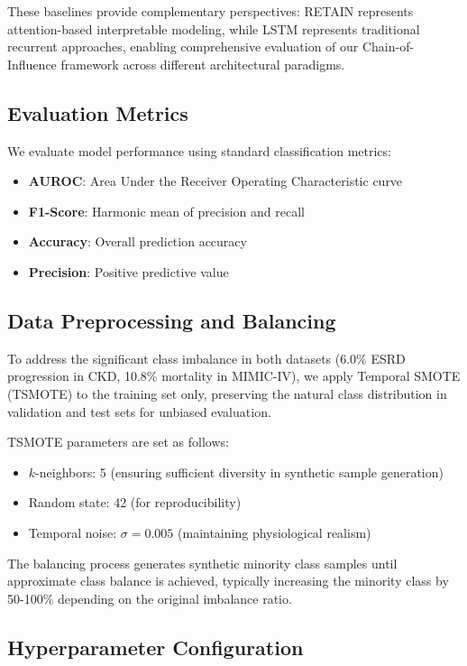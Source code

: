 \documentclass[letterpaper]{article}
\begin{document}
\begin{enumerate}
These baselines provide complementary perspectives: RETAIN represents attention-based interpretable modeling, while LSTM represents traditional recurrent approaches, enabling comprehensive evaluation of our Chain-of-Influence framework across different architectural paradigms.

\subsection{Evaluation Metrics}

We evaluate model performance using standard classification metrics:
\begin{itemize}
    \item \textbf{AUROC}: Area Under the Receiver Operating Characteristic curve
    \item \textbf{F1-Score}: Harmonic mean of precision and recall
    \item \textbf{Accuracy}: Overall prediction accuracy
    \item \textbf{Precision}: Positive predictive value
\end{itemize}

\subsection{Data Preprocessing and Balancing}

To address the significant class imbalance in both datasets (6.0\% ESRD progression in CKD, 10.8\% mortality in MIMIC-IV), we apply Temporal SMOTE (TSMOTE) to the training set only, preserving the natural class distribution in validation and test sets for unbiased evaluation.

TSMOTE parameters are set as follows:
\begin{itemize}
    \item $k$-neighbors: 5 (ensuring sufficient diversity in synthetic sample generation)
    \item Random state: 42 (for reproducibility)
    \item Temporal noise: $\sigma = 0.005$ (maintaining physiological realism)
\end{itemize}

The balancing process generates synthetic minority class samples until approximate class balance is achieved, typically increasing the minority class by 50-100\% depending on the original imbalance ratio.

\subsection{Hyperparameter Configuration}


\end{enumerate}
\end{document}
